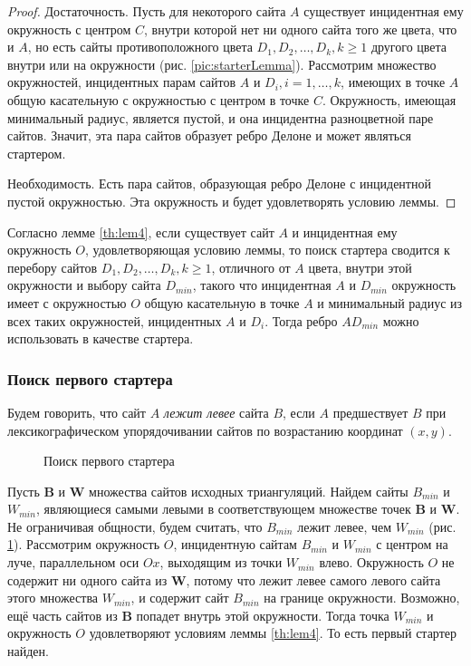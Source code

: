 \documentclass[12pt]{article}
\begin{document}
\begin{proof}
Достаточность. Пусть для некоторого сайта $A$ существует инцидентная ему окружность с центром $C$,
внутри которой нет ни одного сайта того же цвета, что и $A$,
но есть сайты противоположного цвета $D_1, D_2, \ldots, D_k, k \ge 1$ другого цвета внутри или на окружности (рис. \ref{pic:starterLemma}).
Рассмотрим множество окружностей, инцидентных парам сайтов $A$ и $D_i, i = 1, \ldots, k$,
имеющих в точке $A$ общую касательную с окружностью с центром в точке $C$.
Окружность, имеющая минимальный радиус, является пустой, и она инцидентна разноцветной паре сайтов.
Значит, эта пара сайтов образует ребро Делоне и может являться стартером.

Необходимость. Есть пара сайтов, образующая ребро Делоне с инцидентной пустой окружностью.
Эта окружность и будет удовлетворять условию леммы.
\end{proof}

Согласно лемме \ref{th:lem4}, если существует сайт $A$ и инцидентная ему окружность $O$, удовлетворяющая условию леммы,
то поиск стартера сводится к перебору сайтов $D_1, D_2, \ldots, D_k, k \ge 1$, отличного от $A$ цвета,
внутри этой окружности и выбору сайта $D_{min}$,
такого что инцидентная $A$ и $D_{min}$ окружность имеет с окружностью $O$ общую касательную в точке $A$ и
минимальный радиус из всех таких окружностей, инцидентных $A$ и $D_i$.
Тогда ребро $AD_{min}$ можно использовать в качестве стартера.

\subsubsection{Поиск первого стартера}
Будем говорить, что сайт $A$ {\itshape лежит левее} сайта $B$,
если $A$ предшествует $B$ при лексикографическом упорядочивании сайтов по возрастанию координат $(x, y)$.

\begin{figure}[htb!]
	\caption{Поиск первого стартера}
	\label{pic:starterExample}
\end{figure}

Пусть $\textbf{B}$ и $\textbf{W}$ множества сайтов исходных триангуляций.
Найдем сайты $B_{min}$ и $W_{min}$, являющиеся самыми левыми в соответствующем множестве точек $\textbf{B}$ и $\textbf{W}$.
Не ограничивая общности, будем считать, что $B_{min}$ лежит левее, чем $W_{min}$  (рис. \ref{pic:starterExample}).
Рассмотрим окружность $O$, инцидентную сайтам $B_{min}$ и $W_{min}$ с центром на луче, параллельном оси $Ox$,
выходящим из точки $W_{min}$ влево.
Окружность $O$ не содержит ни одного сайта из $\textbf{W}$, потому что лежит левее самого левого сайта этого множества $W_{min}$,
и содержит сайт $B_{min}$ на границе окружности.
Возможно, ещё часть сайтов из $\textbf{B}$ попадет внутрь этой окружности.
Тогда точка $W_{min}$ и окружность $O$ удовлетворяют условиям леммы \ref{th:lem4}.
То есть первый стартер найден.
\end{document}
